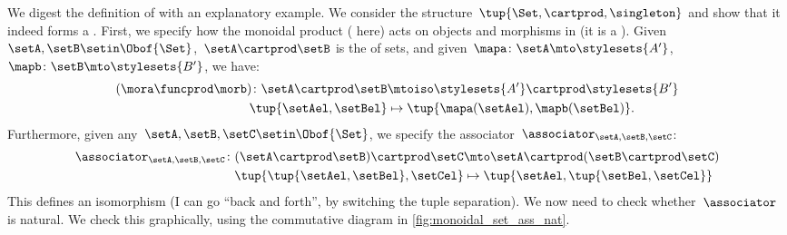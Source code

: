 
\begin{example}
    We digest the definition of  with an explanatory example.
    We consider the structure~$\tup{\Set,\cartprod,\singleton}$ and show that it indeed forms a .
    First, we specify how the monoidal product ( here) acts on objects and morphisms in \Set (it is a ).
    Given~$\setA,\setB\setin \Obof{\Set}$,~$\setA\cartprod \setB$ is the  of sets, and given~$\mapa\colon \setA\mto \stylesets{A'}$,~$\mapb\colon \setB\mto \stylesets{B'}$, we have:
    \begin{equation}
        \label{eq:set_mon_prod_2}
        \begin{aligned}
            (\mora \funcprod \morb)
            \colon \setA\cartprod \setB & \mtoiso \stylesets{A'}\cartprod \stylesets{B'} \\
            \tup{\setAel,\setBel}       & \mapsto \tup{\mapa(\setAel),\mapb(\setBel)}.
        \end{aligned}
    \end{equation}
    Furthermore, given any~$\setA,\setB,\setC\setin \Obof{\Set}$, we specify the associator~$\associator_{\setA,\setB,\setC}$:
    \begin{equation}
        \label{eq:set_mon_prod_3}
        \begin{aligned}
            \associator_{\setA,\setB,\setC}\colon (\setA\cartprod \setB)\cartprod \setC & \mto \setA\cartprod (\setB\cartprod \setC) \\
            \tup{\tup{\setAel,\setBel},\setCel}                                         & \mapsto \tup{\setAel, \tup{\setBel,\setCel}}
        \end{aligned}
    \end{equation}
    This defines an isomorphism (I can go ``back and forth'', by switching the tuple separation).
    We now need to check whether~$\associator$ is natural.
    We check this graphically, using the commutative diagram in \cref{fig:monoidal_set_ass_nat}.


\end{example}
